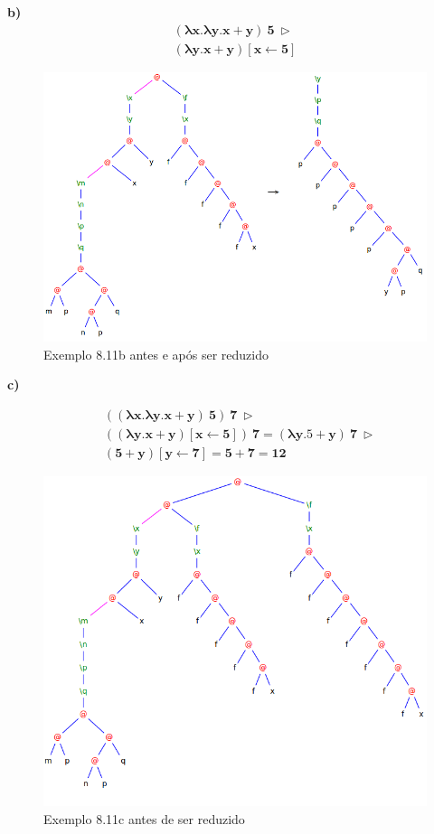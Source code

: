 \documentclass[a4paper]{article}
\begin{document}
\FloatBarrier
\textbf{b)}
\begin{align*}
\mathbf{(\lambda x.\lambda y.x + y)\ 5\ \rhd }\\
\mathbf{(\lambda y.x + y) [x \leftarrow 5]}
\end{align*}

\begin{figure}[h]
  \centering
  \includegraphics[scale=0.5]{8-11_b.png}
  \caption{Exemplo 8.11b antes e após ser reduzido}
\end{figure}

\FloatBarrier

\textbf{c)}

\begin{align*}
&\mathbf{((\lambda x.\lambda y.x + y)\ 5)\ 7\ \rhd} \\
&\mathbf{((\lambda y.x + y) [x \leftarrow 5])\ 7 = (\lambda y.5 + y)\ 7\ \rhd} \\
&\mathbf{(5 + y)[y \leftarrow 7] = 5 + 7 = 12}
\end{align*}

\begin{figure}[h]
  \centering
  \includegraphics[scale=0.5]{8-11c_1.png}
  \caption{Exemplo 8.11c antes de ser reduzido}
\end{figure}
\end{document}
